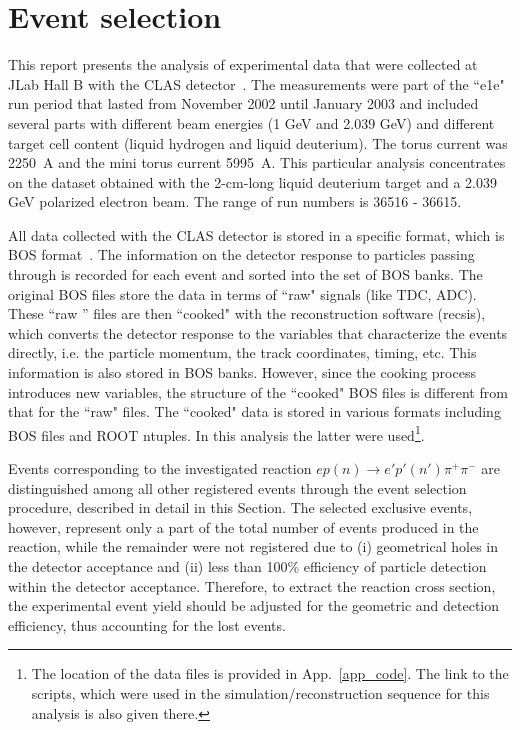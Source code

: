 \chapter{Event selection}
\label{Sect:select}


This report presents the analysis of experimental data that were collected at JLab Hall B with the CLAS detector~\cite{Mecking:2003zu}. The measurements were part of the ``e1e" run period that lasted from November 2002 until January 2003 and included several parts with different beam energies (1 GeV and 2.039 GeV) and different target cell content (liquid hydrogen and liquid deuterium). The torus current was 2250~A and the mini torus current 5995~A. This particular analysis concentrates on the dataset obtained with the 2-cm-long liquid deuterium target and a 2.039 GeV polarized electron beam. The range of run numbers is 36516 - 36615. 

All data collected with the CLAS detector is stored in a specific format, which is BOS format~\cite{BOS:bank,Stepanyan:1999}. The information on the detector response to particles passing through is recorded for each event and sorted into the set of BOS banks. The original BOS files store the data in terms of ``raw" signals (like TDC, ADC). These ``raw '' files are then ``cooked" with the reconstruction software (recsis), which converts the detector response to the variables that characterize the events directly, i.e. the particle momentum, the track coordinates, timing, etc. This information is also stored in BOS banks. However, since the cooking process introduces new variables, the structure of the ``cooked" BOS files is different from that for the ``raw" files. The ``cooked" data is stored in various formats including BOS files and ROOT ntuples. In this analysis the latter were used\footnote[1]{The location of the data files is provided in App.~\ref{app_code}. The link to the scripts, which were used in the simulation/reconstruction sequence for this analysis is also given there.}.


Events corresponding to the investigated reaction $ep(n) \rightarrow e'p'(n')\pi^{+}\pi^{-}$ are distinguished among all other registered events through the event selection procedure, described in detail in this Section.  The selected exclusive events,  however, represent only a part of the total number of events produced in the reaction, while the remainder were not registered due to (i) geometrical holes in the detector acceptance and (ii) less than 100\% efficiency of particle detection within the detector acceptance. Therefore, to extract the reaction cross section, the experimental event yield should be adjusted for the geometric and detection efficiency, thus accounting for the lost events.


